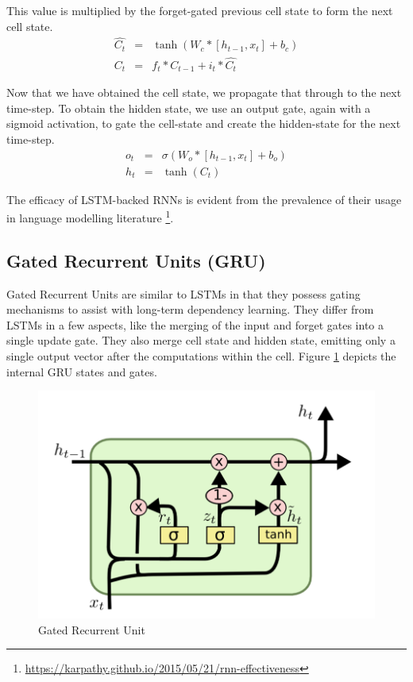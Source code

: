 This value is multiplied by the forget-gated previous cell state to form the next cell state.
\begin{eqnarray*}
	\hat{C_t} &=& \tanh(W_c*[h_{t-1}, x_t] + b_c) \\
	C_t &=& f_t * C_{t-1} + i_t * \hat{C_t}
\end{eqnarray*}

Now that we have obtained the cell state, we propagate that through to the next time-step. To obtain the hidden state, we use an output gate, again with a sigmoid activation, to gate the cell-state and create the hidden-state for the next time-step.
\begin{eqnarray*}
	o_t &=& \sigma(W_o*[h_{t-1}, x_t] + b_o) \\
	h_t &=& \tanh(C_t)
\end{eqnarray*}

The efficacy of LSTM-backed RNNs is evident from the prevalence of their usage in language modelling literature \citep{sundermeyer2012lstm,gers2001lstm,graves2005framewise} \footnote{\url{https://karpathy.github.io/2015/05/21/rnn-effectiveness}}.

\subsection{Gated Recurrent Units (GRU)}

Gated Recurrent Units \citep{cho2014learning} are similar to LSTMs in that they possess gating mechanisms to assist with long-term dependency learning. They differ from LSTMs in a few aspects, like the merging of the input and forget gates into a single update gate. They also merge cell state and hidden state, emitting only a single output vector after the computations within the cell. Figure \ref{fig:gru} depicts the internal GRU states and gates.

\begin{figure}[ht]
	\centering
	\includegraphics[width=\textwidth]{images/gru}
	\caption{\label{fig:gru} Gated Recurrent Unit}
\end{figure}


